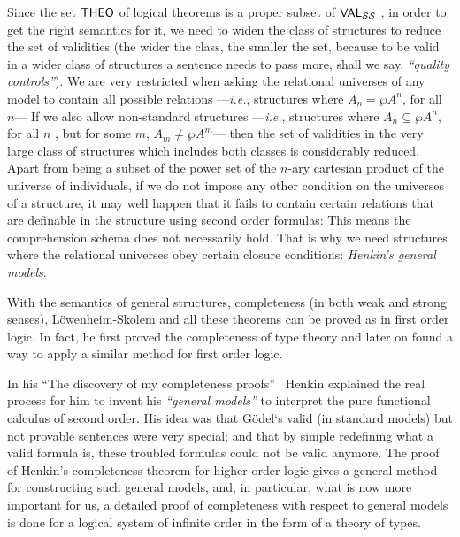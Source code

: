 Since the set $\textsf{THEO}$ of logical theorems is a proper subset of 
$\textsf{VAL}_{\mathcal{SS}}$ , in order to get the right semantics for it, we
need to widen the class of structures to reduce the set of validities (the
wider the class, the smaller the set, because to be valid in a wider class
of structures a sentence needs to pass more, shall we say, 
\emph{``quality controls''}). We are very
restricted when asking the relational universes of any model to contain all
possible relations ---\emph{i.e.}, structures where $A_{n}=\mathcal{\wp }%
A^{n}$, for all $n$--- If we also allow non-standard structures ---\emph{i.e.}, structures where $A_{n}\subseteq \mathcal{\wp }A^{n}$, for all $n$ , but
for some $m$, $A_{m}\neq \mathcal{\wp }A^{m}$--- then the set of validities
in the very large class of structures which includes both classes is
considerably reduced. Apart from being a subset of the power set of the 
$n$-ary cartesian product of the universe of individuals, if we do not impose
any other condition on the universes of a structure, it may well happen that
it fails to contain certain relations that are definable in the structure
using second order formulas: This means the comprehension schema does not
necessarily hold. That is why we need structures where the relational
universes obey certain closure conditions: \emph{Henkin's general models}.

With the semantics of general structures, completeness (in both weak and
strong senses), L\"{o}wenheim-Skolem and all these theorems can be proved as
in first order logic. In fact, he first proved the completeness of type
theory and later on found a way to apply a similar method for first order
logic.

In his ``The discovery of my completeness
proofs''~\cite{Henkin1996} Henkin explained the real
process for him to invent his \emph{``general
models''} to interpret the pure functional calculus of
second order. His idea was that G\"{o}del`s valid (in standard models) but
not provable sentences were very special; and that by simple redefining what
a valid formula is, these troubled formulas could not be valid anymore. The
proof of Henkin's completeness theorem for higher order logic gives a
general method for constructing such general models, and, in particular,
what is now more important for us, a detailed proof of completeness with
respect to general models is done for a logical system of infinite order in
the form of a theory of types.

